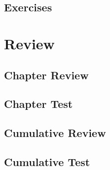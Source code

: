 \subsection{Exercises}

\newpage
\section{Review}
\subsection{Chapter Review}
\subsection{Chapter Test}
\subsection{Cumulative Review}
\subsection{Cumulative Test}


